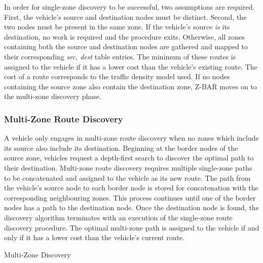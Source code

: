 \documentclass[conference]{IEEEtran}
\begin{document}
In order for single-zone discovery to be successful, two assumptions are required. First, the vehicle's source and destination nodes must be distinct. Second, the two nodes must be present in the same zone. If the vehicle's source \textit{is} its destination, no work is required and the procedure exits. Otherwise, all zones containing both the source and destination nodes are gathered and mapped to their corresponding \textit{src, dest} table entries. The minimum of these routes is assigned to the vehicle if it has a lower cost than the vehicle's existing route. The cost of a route corresponds to the traffic density model used. If no nodes containing the source zone also contain the destination zone, Z-BAR moves on to the multi-zone discovery phase.

\subsubsection{Multi-Zone Route Discovery}

A vehicle only engages in multi-zone route discovery when no zones which include its source also include its destination. Beginning at the border nodes of the source zone, vehicles request a depth-first search to discover the optimal path to their destination. Multi-zone route discovery requires multiple single-zone paths to be concatenated and assigned to the vehicle as its new route. The path from the vehicle's source node to each border node is stored for concatenation with the corresponding neighbouring zones. This process continues until one of the border nodes has a path to the destination node. Once the destination node is found, the discovery algorithm terminates with an execution of the single-zone route discovery procedure. The optimal multi-zone path is assigned to the vehicle if and only if it has a lower cost than the vehicle's current route.

\begin{algorithm}[H]
  \caption{Multi-Zone Discovery}
  \label{route_discovery_multi_zone}
  \begin{algorithmic}[1]
  \EndProcedure
  \end{algorithmic}
\end{algorithm}
\end{document}
